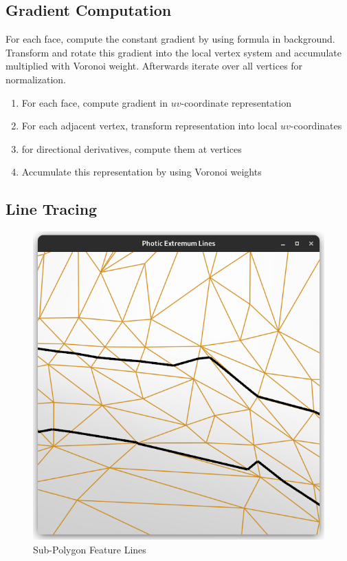 \documentclass[9pt,fleqn,twoside,twocolumn]{stdglobal}
\begin{document}
  \subsection{Gradient Computation}
    For each face, compute the constant gradient by using formula in background.
    Transform and rotate this gradient into the local vertex system and accumulate multiplied with Voronoi weight.
    Afterwards iterate over all vertices for normalization.

    \begin{tcolorbox}[%
      colframe=black,
      colbacktitle=white,
      coltitle=black,
      colback=mathdefback,
      attach boxed title to top center={yshift=-2mm},
      enhanced,
      titlerule=0.1pt,
      boxrule=0.5pt,
      arc=5pt,
      breakable,
      width=\linewidth,
      title=Gradient Algorithm
    ]
      \begin{enumerate}
        \item For each face, compute gradient in $uv$-coordinate representation
        \item For each adjacent vertex, transform representation into local $uv$-coordinates
        \item for directional derivatives, compute them at vertices
        \item Accumulate this representation by using Voronoi weights
      \end{enumerate}
    \end{tcolorbox}

  \subsection{Line Tracing}

    \begin{figure}[h]
      \centering
      \includegraphics[width=0.8\linewidth,trim={15px 15 15 50},clip]{images/subpolygon-lines.png}
      \caption{Sub-Polygon Feature Lines}
    \end{figure}
\end{document}

